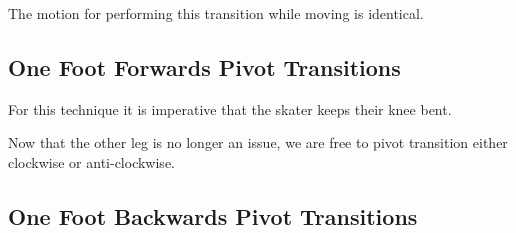 The motion for performing this transition while moving is identical.  

\subsection{One Foot Forwards Pivot Transitions}
\label{sec:transitions/pivot/one_foot_forwards}
For this technique it is imperative that the skater keeps their knee bent.

Now that the other leg is no longer an issue, we are free to pivot transition either clockwise or anti-clockwise.

\subsection{One Foot Backwards Pivot Transitions}

